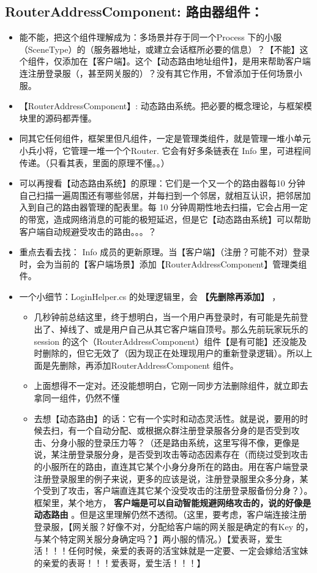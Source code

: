 \documentclass[9pt, b5paper]{article}
\begin{document}
\subsection{RouterAddressComponent: 路由器组件：}
\label{sec-7-9}
\begin{itemize}
\item 能不能，把这个组件理解成为：多场景并存于同一个Process 下的小服（SceneType）的（服务器地址，或建立会话框所必要的信息）？【不能】这个组件，仅添加在【客户端】。这个【动态路由地址组件】，是用来帮助客户端连注册登录服（，甚至网关服的）？没有其它作用，不曾添加于任何场景小服。
\item 【RouterAddressComponent】: 动态路由系统。把必要的概念理论，与框架模块里的源码都弄懂。
\item 同其它任何组件，框架里但凡组件，一定是管理类组件，就是管理一堆小单元小兵小将，它管理一堆一个个Router. 它会有好多条链表在 Info 里，可进程间传递。（只看其表，里面的原理不懂。。）
\item 可以再搜看【动态路由系统】的原理：它们是一个又一个的路由器每10 分钟自己扫描一遍周围还有哪些邻居，并每扫到一个邻居，就相互认识，把邻居加入到自己的路由器管理的配表里。每 10 分钟周期性地去扫描，它会占用一定的带宽，造成网络消息的可能的极短延迟，但是它【动态路由系统】可以帮助客户端自动规避受攻击的路由。。。？
\item 重点去看去找： Info 成员的更新原理。当【客户端】（注册？可能不对）登录时，会为当前的【客户端场景】添加【RouterAddressComponent】管理类组件。
\item 一个小细节：LoginHelper.cs 的处理逻辑里，会 \textbf{【先删除再添加】} ，
\begin{itemize}
\item 几秒钟前总结这里，终于想明白，当一个用户再登录时，有可能是先前登出了、掉线了、或是用户自己从其它客户端自顶号。那么先前玩家玩乐的 session 的这个（RouterAddressComponent）组件【是有可能】还没能及时删除的，但它无效了（因为现正在处理现用户的重新登录逻辑）。所以上面是先删除，再添加RouterAddressComponent 组件。
\item 上面想得不一定对。还没能想明白，它刚一同步方法删除组件，就立即去拿同一组件，仍然不懂
\item 去想【动态路由】的话：它有一个实时和动态灵活性。就是说，要用的时候去扫，有一个自动分配、或根据众群注册登录服各分身的是否受到攻击、分身小服的登录压力等？（还是路由系统，这里写得不像，更像是说，某注册登录服分身，是否受到攻击等动态因素存在（而绕过受到攻击的小服所在的路由，直连其它某个小身分身所在的路由。用在客户端登录注册登录服里的例子来说，更多的应该是说，注册登录服里众多分身，某个受到了攻击，客户端直连其它某个没受攻击的注册登录服备份分身？）。框架里，某个地方， \textbf{客户端是可以自动智能规避网络攻击的，说的好像是动态路由} 。但是这里理解仍然不透彻。（这里，要考虑，客户端连接注册登录服，【网关服？好像不对，分配给客户端的网关服是确定的有Key 的，与某个特定网关服分身确定吗？】两小服的情况。）【爱表哥，爱生活！！！任何时候，亲爱的表哥的活宝妹就是一定要、一定会嫁给活宝妹的亲爱的表哥！！！爱表哥，爱生活！！！】

\end{itemize}
\end{itemize}
\end{document}
